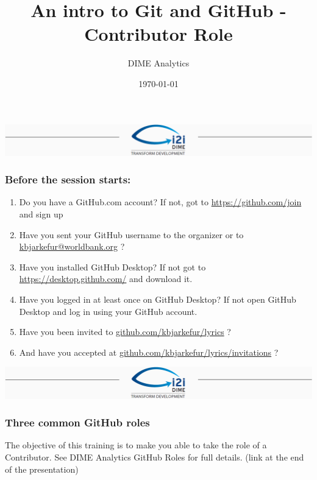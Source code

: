 \documentclass[aspectratio=169]{beamer} %
\title{An intro to Git and GitHub - Contributor Role}
\author{DIME Analytics}
\institute{DIME - The World Bank - \trainingURL{https://www.worldbank.org/en/research/dime}}
\date{\today}
\makeatletter
\newcommand{\trainingURL}[1]{{\color{blue}\url{#1}}}
\newcommand{\traininerUsername}{kbjarkefur}
\newcommand{\repoName}{\traininerUsername/lyrics}
\newcommand{\trainingRepoURL}[1]{\trainingURL{github.com/\repoName #1}}
\newcommand{\trainerEmail}{\trainingURL{kbjarkefur@worldbank.org} }
\makeatother
\begin{document}
\begin{frame}
\includegraphics[width=\textwidth]{../../Common-Resources/img/Header.png}
\vspace{-0.2cm}
\titlepage 	 %
\end{frame}

\begin{frame}
\frametitle{Before the session starts:}
	\begin{enumerate}
		\item Do you have a GitHub.com account? If not, got to \trainingURL{https://github.com/join} and sign up
		\item Have you sent your GitHub username to the organizer or to \trainerEmail?
		\item Have you installed GitHub Desktop? If not got to \trainingURL{https://desktop.github.com/} and download it.
		\item Have you logged in at least once on GitHub Desktop? If not open GitHub Desktop and log in using your GitHub account.
		\item Have you been invited to \trainingRepoURL{} ?
		\item And have you accepted at \trainingRepoURL{/invitations} ?
	\end{enumerate}

\end{frame}

\begin{frame}
\includegraphics[width=\textwidth]{../../Common-Resources/img/Header.png}
\vspace{-0.2cm}
\titlepage 	 %
\end{frame}

\begin{frame}
	\frametitle{Three common GitHub roles}

	\small The objective of this training is to make you able to take the role of a Contributor. See DIME Analytics GitHub Roles for full details. (link at the end of the presentation)

	

\end{frame}
\end{document}
